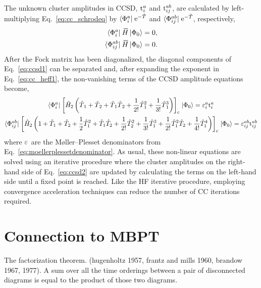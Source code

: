 \documentclass[thesis.tex]{subfiles}
\begin{document}
The unknown cluster amplitudes in CCSD, $\text{t}^{a}_{i}$ and $\text{t}^{ab}_{ij}$, are calculated by left-multiplying Eq.\ \eqref{eq:cc_schrodeq} by $\langle \Phi^{a}_{i} |\hspace{1pt} \operatorname{e}^{-\hat{T}\hspace{-0.25pt}}$ and $\langle \Phi^{ab}_{ij} |\hspace{1pt} \operatorname{e}^{-\hat{T}\hspace{-0.25pt}}$, respectively,
\begin{align} \label{eq:ccsd1}
  \statebra{a}{i} \EHam \refket &= 0, \\
  \statebra{ab}{ij} \EHam \refket &= 0. \notag
\end{align}
After the Fock matrix has been diagonalized, the diagonal components of Eq.\ \eqref{eq:ccsd1} can be separated and, after expanding the exponent in Eq.\ \eqref{eq:cc_heff1}, the non-vanishing terms of the CCSD amplitude equations become,
\begin{gather} \label{eq:ccsd2}
  \langle \Phi^{a}_{i} |\hspace{1pt} \left[ \hat{H}\hspace{-1pt}_{2} \left(\hat{T}\hspace{-0.25pt}_{1} + \hat{T}\hspace{-0.25pt}_{2} + \hat{T}\hspace{-0.25pt}_{1}\hat{T}\hspace{-0.25pt}_{2} + \frac{1}{2!} \hat{T}\hspace{-0.25pt}_{1}^{2} + \frac{1}{3!} \hat{T}\hspace{-0.25pt}_{1}^{3}\right) \right]_{\mathrm{c}} \hspace{1pt}\lvert \Phi_{0} \rangle = \varepsilon^{a}_{i}\text{t}^{a}_{i} \\
  \langle \Phi^{ab}_{ij} |\hspace{1pt} \left[ \hat{H}\hspace{-1pt}_{2} \left(1 + \hat{T}_1 + \hat{T}_2 + \frac{1}{2} \hat{T}_1^{2} + \hat{T}_1\hat{T}_2 + \frac{1}{2!} \hat{T}_2^{2} + \frac{1}{3!} \hat{T}_1^{3} + \frac{1}{2!} \hat{T}_1^{2} \hat{T}_2 + \frac{1}{4!} \hat{T}_1^{4}\right) \right]_{\mathrm{c}} \hspace{1pt}\lvert \Phi_{0} \rangle = \varepsilon^{ab}_{ij}\text{t}^{ab}_{ij} \notag
\end{gather}
where $\varepsilon^{}_{}$ are the M\o ller--Plesset denominators from Eq.\ \eqref{eq:moellerplessetdenominator}.  As usual, these non-linear equations are solved using an iterative procedure where the cluster amplitudes on the right-hand side of Eq.\ \eqref{eq:ccsd2} are updated by calculating the terms on the left-hand side until a fixed point is reached.  Like the HF iterative procedure, employing convergence acceleration techniques can reduce the number of CC iterations required.


\section{Connection to MBPT} \label{section:linkedcluster}

The factorization theorem. (hugenholtz 1957, frantz and mills 1960, brandow 1967, 1977).
A sum over all the time orderings between a pair of disconnected diagrams is equal to the product of those two diagrams.
\end{document}
